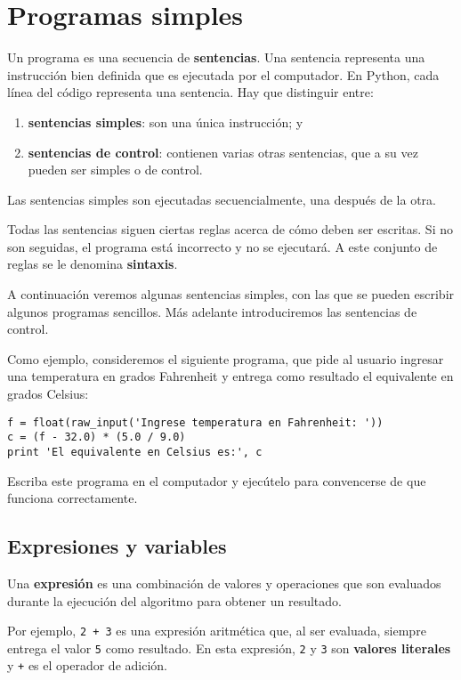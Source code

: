 \chapter{Programas simples}

Un programa es una secuencia de \textbf{sentencias}. Una sentencia
representa una instrucción bien definida que es ejecutada por el
computador. En Python, cada línea del código representa una sentencia.
Hay que distinguir entre:
\begin{enumerate}
  \item \textbf{sentencias simples}: son una única instrucción; y
  \item \textbf{sentencias de control}: contienen varias otras sentencias, que
    a su vez pueden ser simples o de control.
\end{enumerate}

Las sentencias simples son ejecutadas secuencialmente, una después de la
otra.

Todas las sentencias siguen ciertas reglas acerca de cómo deben ser
escritas. Si no son seguidas, el programa está incorrecto y no se
ejecutará. A este conjunto de reglas se le denomina \textbf{sintaxis}.

A continuación veremos algunas sentencias simples, con las que se pueden
escribir algunos programas sencillos. Más adelante introduciremos las
sentencias de control.

Como ejemplo, consideremos el siguiente programa, que pide al usuario
ingresar una temperatura en grados Fahrenheit y entrega como resultado
el equivalente en grados Celsius:

\begin{lstlisting}
f = float(raw_input('Ingrese temperatura en Fahrenheit: '))
c = (f - 32.0) * (5.0 / 9.0)
print 'El equivalente en Celsius es:', c
\end{lstlisting}

Escriba este programa en el computador
y ejecútelo para convencerse de que funciona correctamente.

\section{Expresiones y variables}

Una \textbf{expresión} es una combinación de valores y operaciones que
son eva\-luados durante la ejecución del algoritmo para obtener un
resultado.

Por ejemplo, \lstinline!2 + 3! es una expresión aritmética que, al ser
evaluada, siempre entrega el valor \lstinline!5! como resultado. En esta
expresión, \lstinline!2! y \lstinline!3! son \textbf{valores literales}
y \lstinline!+! es el operador de adición.


